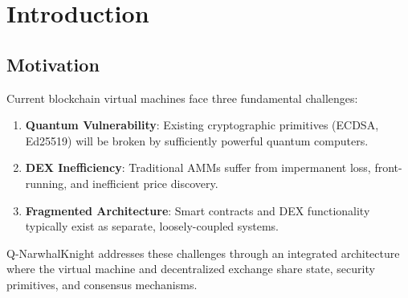 \documentclass[11pt,a4paper]{article}
\begin{document}
\begin{abstract}
\noindent Q-NarwhalKnight introduces a novel blockchain architecture that combines a post-quantum secure virtual machine with a physics-inspired decentralized exchange. The system leverages quantum mechanical concepts---superposition, entanglement, and wave function collapse---as metaphors for advanced trading mechanics while implementing genuine post-quantum cryptographic primitives for future-proof security. This paper describes the technical architecture, execution model, pricing algorithms, and security mechanisms of the integrated VM-DEX platform.

\vspace{0.5cm}
\noindent\textbf{Keywords:} Blockchain, Virtual Machine, Decentralized Exchange, Post-Quantum Cryptography, AMM, DAG Consensus
\end{abstract}

\newpage
\tableofcontents
\newpage

\section{Introduction}

\subsection{Motivation}

Current blockchain virtual machines face three fundamental challenges:

\begin{enumerate}[leftmargin=*]
    \item \textbf{Quantum Vulnerability}: Existing cryptographic primitives (ECDSA, Ed25519) will be broken by sufficiently powerful quantum computers.
    \item \textbf{DEX Inefficiency}: Traditional AMMs suffer from impermanent loss, front-running, and inefficient price discovery.
    \item \textbf{Fragmented Architecture}: Smart contracts and DEX functionality typically exist as separate, loosely-coupled systems.
\end{enumerate}

Q-NarwhalKnight addresses these challenges through an integrated architecture where the virtual machine and decentralized exchange share state, security primitives, and consensus mechanisms.
\end{document}
